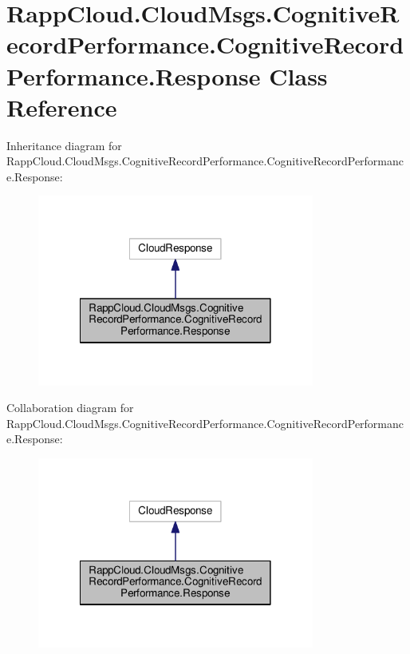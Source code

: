 \hypertarget{classRappCloud_1_1CloudMsgs_1_1CognitiveRecordPerformance_1_1CognitiveRecordPerformance_1_1Response}{\section{Rapp\-Cloud.\-Cloud\-Msgs.\-Cognitive\-Record\-Performance.\-Cognitive\-Record\-Performance.\-Response Class Reference}
\label{classRappCloud_1_1CloudMsgs_1_1CognitiveRecordPerformance_1_1CognitiveRecordPerformance_1_1Response}
}


Inheritance diagram for Rapp\-Cloud.\-Cloud\-Msgs.\-Cognitive\-Record\-Performance.\-Cognitive\-Record\-Performance.\-Response\-:
\nopagebreak
\begin{figure}[H]
\begin{center}
\leavevmode
\includegraphics[width=258pt]{classRappCloud_1_1CloudMsgs_1_1CognitiveRecordPerformance_1_1CognitiveRecordPerformance_1_1Response__inherit__graph}
\end{center}
\end{figure}


Collaboration diagram for Rapp\-Cloud.\-Cloud\-Msgs.\-Cognitive\-Record\-Performance.\-Cognitive\-Record\-Performance.\-Response\-:
\nopagebreak
\begin{figure}[H]
\begin{center}
\leavevmode
\includegraphics[width=258pt]{classRappCloud_1_1CloudMsgs_1_1CognitiveRecordPerformance_1_1CognitiveRecordPerformance_1_1Response__coll__graph}
\end{center}
\end{figure}
